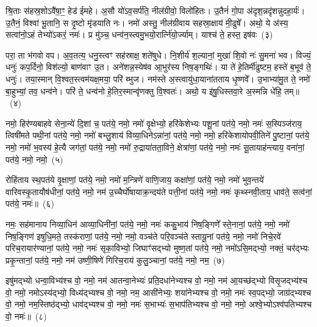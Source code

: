 श्रि॒ताः स॑हस्र॒शो\-ऽवै॑षा॒ꣳ॒ हेड॑ ईमहे। अ॒सौ यो॑\-ऽव॒सर्प॑ति॒ नील॑ग्रीवो॒ विलो॑हितः। उ॒तैनं॑ गो॒पा अ॑दृश॒न्नदृ॑शन्नुदहा॒र्यः॑। उ॒तैनं॒ विश्वा॑ भू॒तानि॒ स दृ॒ष्टो मृ॑डयाति नः। नमो॑ अस्तु॒ नील॑ग्रीवाय सहस्रा॒क्षाय॑ मी॒ढुषे᳚। अथो॒ ये अ॑स्य॒ सत्वा॑नो॒\-ऽहं तेभ्यो॑\-ऽकरं॒ नमः॑। प्र मु॑ञ्च॒ धन्व॑न॒स्त्वमु॒भयो॒रार्त्नि॑यो॒र्ज्याम्। याश्च॑ ते॒ हस्त॒ इष॑वः~(३)

परा॒ ता भ॑गवो वप। अ॒व॒तत्य॒ धनु॒स्त्वꣳ सह॑स्राक्ष॒ शते॑षुधे। नि॒शीर्य॑ श॒ल्यानां॒ मुखा॑ शि॒वो नः॑ सु॒मना॑ भव। विज्यं॒ धनुः॑ कप॒र्दिनो॒ विश॑ल्यो॒ बाण॑वाꣳ उ॒त। अने॑शन्न॒स्येष॑व आ॒भुर॑स्य निष॒ङ्गथिः॑। या ते॑ हे॒तिर्मी॑ढुष्टम॒ हस्ते॑ ब॒भूव॑ ते॒ धनुः॑। तया॒स्मान् वि॒श्वत॒स्त्वम॑यक्ष॒मया॒ परि॑ ब्भुज। नम॑स्ते अ॒स्त्वायु॑धा॒याना॑तताय धृ॒ष्णवे᳚। उ॒भाभ्या॑मु॒त ते॒ नमो॑ बा॒हुभ्यां॒ तव॒ धन्व॑ने। परि॑ ते॒ धन्व॑नो हे॒तिर॒स्मान्वृ॑णक्तु वि॒श्वतः॑। अथो॒ य इ॑षु॒धिस्तवा॒रे अ॒स्मन्नि धे॑हि॒ तम्॥~(४)

{\anuvakamend[{हस्ते॑ दि॒क्ष्विष॑व उ॒भाभ्यां॒ द्वाविꣳ॑शतिश्च}]}%

नमो॒ हिर॑ण्यबाहवे सेना॒न्ये॑ दि॒शां च॒ पत॑ये॒ नमो॒ नमो॑ वृ॒क्षेभ्यो॒ हरि॑केशेभ्यः पशू॒नां पत॑ये॒ नमो॒ नमः॑ स॒स्पिञ्ज॑राय॒ त्विषी॑मते पथी॒नां पत॑ये॒ नमो॒ नमो॑ बभ्लु॒शाय॑ विव्या॒धिने\-ऽन्ना॑नां॒ पत॑ये॒ नमो॒ नमो॒ हरि॑केशायोपवी॒तिने॑ पु॒ष्टानां॒ पत॑ये॒ नमो॒ नमो॑ भ॒वस्य॑ हे॒त्यै जग॑तां॒ पत॑ये॒ नमो॒ नमो॑ रु॒द्राया॑तता॒विने॒ क्षेत्रा॑णां॒ पत॑ये॒ नमो॒ नमः॑ सू॒तायाह॑न्त्याय॒ वना॑नां॒ पत॑ये॒ नमो॒ नमो॒~(५)

रोहि॑ताय स्थ॒पत॑ये वृ॒क्षाणां॒ पत॑ये॒ नमो॒ नमो॑ म॒न्त्रिणे॑ वाणि॒जाय॒ कक्षा॑णां॒ पत॑ये॒ नमो॒ नमो॑ भुव॒न्तये॑ वारिवस्कृ॒तायौष॑धीनां॒ पत॑ये॒ नमो॒ नम॑ उ॒च्चैर्घो॑षायाक्र॒न्दय॑ते पत्ती॒नां पत॑ये॒ नमो॒ नमः॑ कृथ्स्नवी॒ताय॒ धाव॑ते॒ सत्व॑नां॒ पत॑ये॒ नमः॑॥~(६)

{\anuvakamend[{वना॑नां॒ पत॑ये॒ नमो॒ नम॒ एका॒न्नत्रि॒ꣳ॒शच्च॑}]}%

नमः॒ सह॑मानाय निव्या॒धिन॑ आव्या॒धिनी॑नां॒ पत॑ये॒ नमो॒ नमः॑ ककु॒भाय॑ निष॒ङ्गिणे᳚ स्ते॒नानां॒ पत॑ये॒ नमो॒ नमो॑ निष॒ङ्गिण॑ इषुधि॒मते॒ तस्क॑राणां॒ पत॑ये॒ नमो॒ नमो॒ वञ्च॑ते परि॒वञ्च॑ते स्तायू॒नां पत॑ये॒ नमो॒ नमो॑ निचे॒रवे॑ परिच॒रायार॑ण्यानां॒ पत॑ये॒ नमो॒ नमः॑ सृका॒विभ्यो॒ जिघाꣳ॑सद्भ्यो मुष्ण॒तां पत॑ये॒ नमो॒ नमो॑\-ऽसि॒मद्भ्यो॒ नक्तं॒ चर॑द्भ्यः प्रकृ॒न्तानां॒ पत॑ये॒ नमो॒ नम॑ उष्णी॒षिणे॑ गिरिच॒राय॑ कुलु॒ञ्चानां॒ पत॑ये॒ नमो॒ नम॒~(७)

इषु॑मद्भ्यो धन्वा॒विभ्य॑श्च वो॒ नमो॒ नम॑ आतन्वा॒नेभ्यः॑ प्रति॒दधा॑नेभ्यश्च वो॒ नमो॒ नम॑ आ॒यच्छ॑द्भ्यो विसृ॒जद्भ्य॑श्च वो॒ नमो॒ नमो\-ऽस्य॑द्भ्यो॒ विध्य॑द्भ्यश्च वो॒ नमो॒ नम॒ आसी॑नेभ्यः॒ शया॑नेभ्यश्च वो॒ नमो॒ नमः॑ स्व॒पद्भ्यो॒ जाग्र॑द्भ्यश्च वो॒ नमो॒ नम॒स्तिष्ठ॑द्भ्यो॒ धाव॑द्भ्यश्च वो॒ नमो॒ नमः॑ स॒भाभ्यः॑ स॒भाप॑तिभ्यश्च वो॒ नमो॒ नमो॒ अश्वे॒भ्यो\-ऽश्व॑पतिभ्यश्च वो॒ नमः॑॥~(८)

